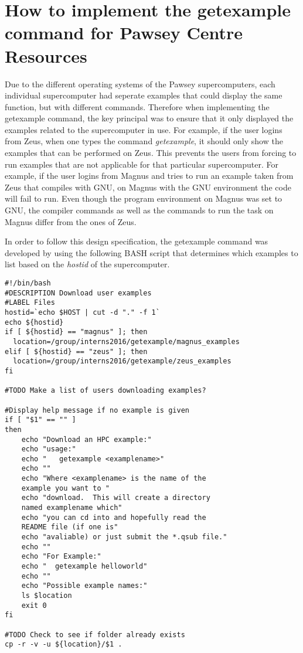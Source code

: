 \section{How to implement the getexample command for Pawsey Centre Resources}

Due to the different operating systems of the Pawsey supercomputers, each individual supercomputer had seperate examples that could display the same
function, but with different commands. Therefore when implementing the getexample command, the key principal was to ensure that it only displayed the
examples related to the supercomputer in use. For example, if the user logins from Zeus, when one types the command \emph{getexample}, it should only
show the examples that can be performed on Zeus. This prevents the users from forcing to run examples that are not applicable for that particular 
supercomputer. For example, if the user logins from Magnus and tries to run an example taken from Zeus that compiles with GNU, on Magnus with the GNU 
environment the code will fail to run. Even though the program environment on Magnus was set to GNU, the compiler commands as well as the commands to
run the task on Magnus differ from the ones of Zeus.

In order to follow this design specification, the getexample command was developed by using the following BASH script that determines which examples to
list based on the \emph{hostid} of the supercomputer.    


\begin{tcolorbox}
\begin{Verbatim}[fontsize=\scriptsize]
#!/bin/bash
#DESCRIPTION Download user examples
#LABEL Files
hostid=`echo $HOST | cut -d "." -f 1`
echo ${hostid}
if [ ${hostid} == "magnus" ]; then 
  location=/group/interns2016/getexample/magnus_examples
elif [ ${hostid} == "zeus" ]; then
  location=/group/interns2016/getexample/zeus_examples
fi

#TODO Make a list of users downloading examples?

#Display help message if no example is given
if [ "$1" == "" ]
then
	echo "Download an HPC example:"
	echo "usage:"
	echo "   getexample <examplename>"
	echo ""
	echo "Where <examplename> is the name of the 
	example you want to "
	echo "download.  This will create a directory 
	named examplename which"
	echo "you can cd into and hopefully read the 
	README file (if one is"
	echo "avaliable) or just submit the *.qsub file."
	echo ""
	echo "For Example:"
	echo "  getexample helloworld"
	echo ""
	echo "Possible example names:"
	ls $location 
	exit 0
fi

#TODO Check to see if folder already exists
cp -r -v -u ${location}/$1 .
\end{Verbatim}
\end{tcolorbox}
